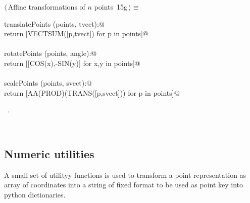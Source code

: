 \documentclass[11pt,oneside]{article}	%
\begin{document}
\begin{flushleft} \small
\begin{minipage}{\linewidth} \label{scrap33}
\protect{}$\langle\,$Affine transformations of $n$ points\nobreak\ {\footnotesize 15g}$\,\rangle\equiv$
\vspace{-1ex}
\begin{list}{}{} \item
\mbox{}\verb@def translatePoints (points, tvect):@\\
\mbox{}\verb@   return [VECTSUM([p,tvect]) for p in points]@\\
\mbox{}\verb@@\\
\mbox{}\verb@def rotatePoints (points, angle):@\\
\mbox{}\verb@   return [[COS(x),-SIN(y)] for x,y in points]@\\
\mbox{}\verb@@\\
\mbox{}\verb@def scalePoints (points, svect):@\\
\mbox{}\verb@   return [AA(PROD)(TRANS([p,svect])) for p in points]@\\
\mbox{}\verb@@{\NWsep}
\end{list}
\vspace{-1ex}
\footnotesize\addtolength{\baselineskip}{-1ex}
\begin{list}{}{\setlength{\itemsep}{-\parsep}\setlength{\itemindent}{-\leftmargin}}
\item \NWtxtMacroRefIn\ .
\end{list}
\end{minipage}\\[4ex]
\end{flushleft}

\subsection{Numeric utilities}

A small set of utilityy functions is used to transform a point representation as array of coordinates into a string of fixed format to be used as point key into python dictionaries.
\end{document}
